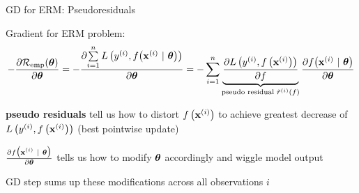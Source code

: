 \documentclass[11pt,compress,t,notes=noshow, xcolor=table]{beamer}
\begin{document}
\begin{framei}[fs=footnotesize]{GD for ERM: Pseudoresiduals}
\item Gradient for ERM problem: 
$$
- \pd{\risket}{\thetav} = - \pd{\sumin \Lxyit}{\thetav}= - \sumin \underbrace{\pd{\Lxyi}{f}}_{\text{pseudo residual } \tilde r^{(i)}(f)} \pd{\fxit}{\thetav}
$$
\item \textbf{pseudo residuals} tell us how to distort $\fxi$ to achieve greatest decrease of $\Lxyi$ (best pointwise update)
\item $\pd{\fxit}{\thetav}$ tells us how to modify $\thetav$ accordingly and wiggle model output
\item GD step sums up these modifications across all observations $i$
{}
\end{framei}


\endlecture
\end{document}
